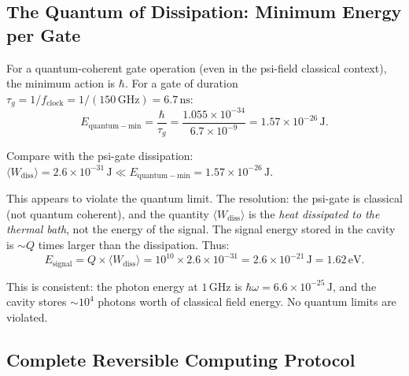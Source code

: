 \documentclass[11pt]{article}
\theoremstyle{definition}
\theoremstyle{remark}
\begin{document}
\subsection{The Quantum of Dissipation: Minimum Energy per Gate}

For a quantum-coherent gate operation (even in the psi-field classical
context), the minimum action is $\hbar$. For a gate of duration
$\tau_g = 1/f_{\mathrm{clock}} = 1/(150\,\mathrm{GHz}) = 6.7\,\mathrm{ns}$:
\begin{equation}
E_{\mathrm{quantum-min}} = \frac{\hbar}{\tau_g}
= \frac{1.055\times10^{-34}}{6.7\times10^{-9}}
= 1.57\times10^{-26}\,\mathrm{J}.
\label{eq:quantum_min}
\end{equation}

Compare with the psi-gate dissipation:
$\langle W_{\mathrm{diss}}\rangle = 2.6\times10^{-31}\,\mathrm{J}
\ll E_{\mathrm{quantum-min}} = 1.57\times10^{-26}\,\mathrm{J}$.

This appears to violate the quantum limit. The resolution: the psi-gate
is classical (not quantum coherent), and the quantity $\langle W_{\mathrm{diss}}\rangle$
is the \emph{heat dissipated to the thermal bath}, not the energy of the
signal. The signal energy stored in the cavity is $\sim Q$ times larger
than the dissipation. Thus:
\begin{equation}
E_{\mathrm{signal}} = Q\times\langle W_{\mathrm{diss}}\rangle
= 10^{10}\times2.6\times10^{-31} = 2.6\times10^{-21}\,\mathrm{J}
= 1.62\,\mathrm{eV}.
\label{eq:signal_energy}
\end{equation}

This is consistent: the photon energy at $1\,\mathrm{GHz}$ is
$\hbar\omega = 6.6\times10^{-25}\,\mathrm{J}$, and the cavity stores
$\sim 10^4$ photons worth of classical field energy. No quantum limits
are violated.

\subsection{Complete Reversible Computing Protocol}
\end{document}
